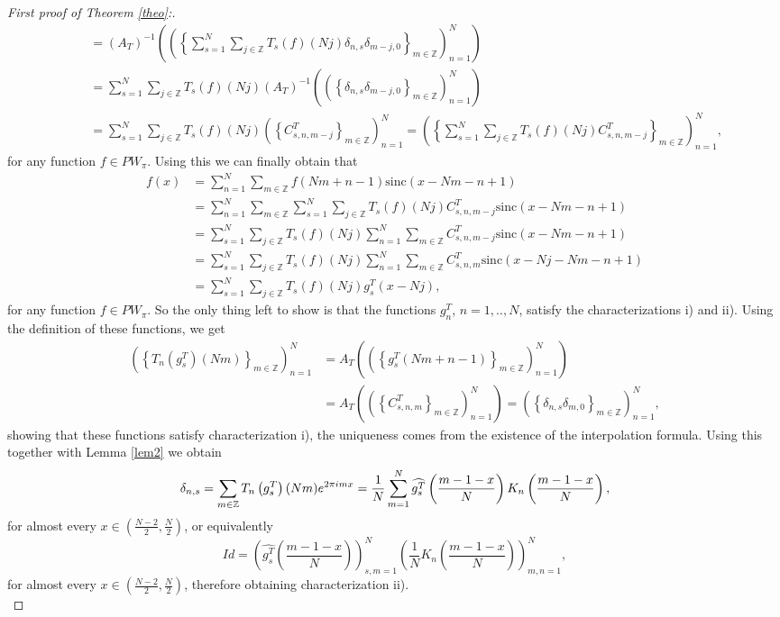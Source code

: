 \documentclass[reqno]{amsart}
\theoremstyle{plain}
\theoremstyle{definition}
\numberwithin{equation}{section}
\newcommand{\Z}{{\mathbb Z}}
\newcommand{\pa}[1]{\left(#1\right)}
\newcommand{\suc}[1]{\left\{#1\right\}}
\newcommand{\sinc}{\mathrm{sinc}}
\begin{document}
\begin{proof}[First proof of Theorem \ref{theo}:]
\begin{align*}
		&\quad = \pa{A_T}^{-1}\pa{\pa{\left\{ 
		\sum_{s=1}^N \sum_{j\in\Z} T_s(f)(Nj) \delta_{n,s}\delta_{m-j,0} \right\}_{m\in\Z}}_{n=1}^N} \\
		&\quad = \sum_{s=1}^N \sum_{j\in\Z} T_s(f)(Nj)
		\pa{A_T}^{-1}\pa{\pa{\left\{ \delta_{n,s}\delta_{m-j,0} \right\}_{m\in\Z}}_{n=1}^N} \\
		&\quad = \sum_{s=1}^N \sum_{j\in\Z} T_s(f)(Nj)
		\pa{\suc{C^T_{s,n,m-j}}_{m\in\Z}}_{n=1}^N
		= \pa{\suc{\sum_{s=1}^N \sum_{j\in\Z} T_s(f)(Nj) 
		C^T_{s,n,m-j}}_{m\in\Z}}_{n=1}^N,
	\end{align*}
	for any function $f\in PW_\pi$. Using this we can finally obtain that
	\begin{align*}
		f(x) &= \sum_{n=1}^N \sum_{m\in\Z} f(Nm+n-1) \sinc(x-Nm-n+1) \\
		&= \sum_{n=1}^N \sum_{m\in\Z} \sum_{s=1}^N \sum_{j\in\Z} T_s(f)(Nj) C^T_{s,n,m-j} \sinc(x-Nm-n+1) \\
		&= \sum_{s=1}^N \sum_{j\in\Z} T_s(f)(Nj) \sum_{n=1}^N \sum_{m\in\Z} C^T_{s,n,m-j} \sinc(x-Nm-n+1) \\
		&= \sum_{s=1}^N \sum_{j\in\Z} T_s(f)(Nj) \sum_{n=1}^N \sum_{m\in\Z} C^T_{s,n,m} \sinc(x-Nj-Nm-n+1) \\
		&= \sum_{s=1}^N \sum_{j\in\Z} T_s(f)(Nj) g^T_s(x-Nj),
	\end{align*}
	for any function $f\in PW_\pi$. So the only thing left to show is that the functions $g^T_n$, $n=1,..,N$, satisfy the characterizations i) and ii). Using the definition of these functions, we get 
	\begin{align*}
		\pa{\suc{T_n\pa{g^T_s}(Nm)}_{m\in\Z}}_{n=1}^N
		&= A_T \pa{\pa{\suc{g^T_s(Nm+n-1)}_{m\in\Z}}_{n=1}^N} \\
		&= A_T \pa{\pa{\suc{C^T_{s,n,m}}_{m\in\Z}}_{n=1}^N}
		= \pa{\suc{\delta_{n,s}\delta_{m,0}}_{m\in\Z}}_{n=1}^N,
	\end{align*}
	showing that these functions satisfy characterization i), the uniqueness comes from the existence of the interpolation formula. Using this together with Lemma \ref{lem2} we obtain
	$$ \delta_{n,s} =\sum_{m\in\Z} T_n\pa{g^T_s}(Nm) e^{2\pi i m x} \\
	= \frac{1}{N} \sum_{m=1}^N \widehat{g^T_s}\pa{\frac{m-1-x}{N}} K_n\pa{\frac{m-1-x}{N}},$$
	for almost every $x\in\pa{\frac{N-2}{2},\frac{N}{2}}$, or equivalently
	$$Id= \pa{\widehat{g^T_s}\pa{\frac{m-1-x}{N}}}_{s,m=1}^N \pa{\frac{1}{N} K_n\pa{\frac{m-1-x}{N}}}_{m,n=1}^N,$$
	for almost every $x\in\pa{\frac{N-2}{2},\frac{N}{2}}$, therefore obtaining characterization ii). \\
\end{proof}
\end{document}
